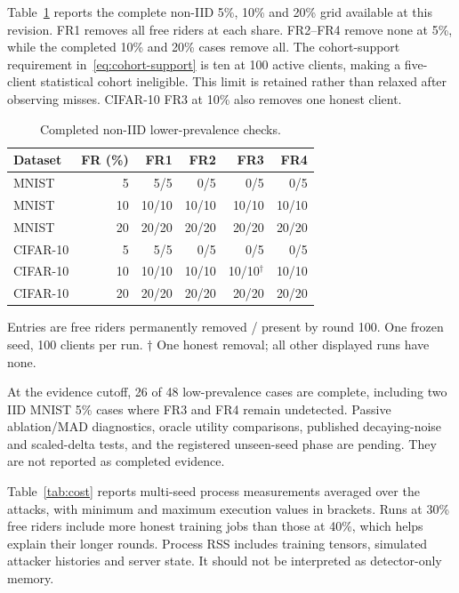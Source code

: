 \documentclass[journal]{IEEEtran}
\makeatletter
\renewcommand{\subsection}{\@startsection{subsection}{2}{\z@}{1.5ex}{0.7ex}{\normalfont\normalsize\itshape}}
\makeatother
\begin{document}
Table~\ref{tab:low-share} reports the complete non-IID 5\%, 10\% and
20\% grid available at this revision. FR1 removes all free riders at each
share. FR2--FR4 remove none at 5\%, while the completed 10\% and 20\%
cases remove all. The cohort-support requirement in~\eqref{eq:cohort-support}
is ten at 100 active clients, making a five-client statistical cohort
ineligible. This limit is retained rather than relaxed after observing
misses. CIFAR-10 FR3 at 10\% also removes one honest client.

\begin{table}[t]\centering\footnotesize\setlength{\tabcolsep}{3.5pt}
\caption{Completed non-IID lower-prevalence checks.}\label{tab:low-share}
\begin{tabular}{lrrrrr}\toprule
Dataset & FR (\%) & FR1 & FR2 & FR3 & FR4 \\ \midrule
MNIST & 5 & 5/5 & 0/5 & 0/5 & 0/5 \\
MNIST & 10 & 10/10 & 10/10 & 10/10 & 10/10 \\
MNIST & 20 & 20/20 & 20/20 & 20/20 & 20/20 \\
\midrule
CIFAR-10 & 5 & 5/5 & 0/5 & 0/5 & 0/5 \\
CIFAR-10 & 10 & 10/10 & 10/10 & 10/10$^{\dagger}$ & 10/10 \\
CIFAR-10 & 20 & 20/20 & 20/20 & 20/20 & 20/20 \\
\bottomrule\end{tabular}
\par\smallskip\parbox{\columnwidth}{\scriptsize Entries are free riders permanently removed / present by round 100. One frozen seed, 100 clients per run. $\dagger$ One honest removal; all other displayed runs have none.}
\end{table}



At the evidence cutoff, 26 of 48 low-prevalence cases are complete,
including two IID MNIST 5\% cases where FR3 and FR4 remain undetected.
Passive ablation/MAD diagnostics, oracle utility comparisons, published
decaying-noise and scaled-delta tests, and the registered unseen-seed
phase are pending. They are not reported as completed evidence.

\subsection{Execution Time and Memory}
Table~\ref{tab:cost} reports multi-seed process measurements averaged over
the attacks, with minimum and maximum execution values in brackets.
Runs at 30\% free riders include more honest training jobs than those at
40\%, which helps explain their longer rounds. Process RSS includes
training tensors, simulated attacker histories and server state.
It should not be interpreted as detector-only memory.
\end{document}
